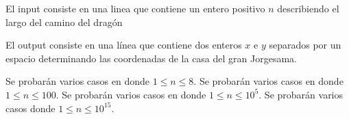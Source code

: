 \documentclass{oci}
\begin{document}
\begin{inputDescription}
El input consiste en una linea que contiene un entero positivo $n$ describiendo el largo del camino del drag\'on
\end{inputDescription}

\begin{outputDescription}
El output consiste en una l\'inea que contiene dos enteros $x$ e $y$ separados por un espacio determinando las coordenadas de la casa del gran Jorgesama.
\end{outputDescription}

\begin{scoreDescription}
 Se probar\'an varios casos en donde $1 \leq n \leq 8$.
 Se probar\'an varios casos en donde $1 \leq n \leq 100$.
 Se probar\'an varios casos en donde $1 \leq n \leq 10^5$.
 Se probar\'an varios casos donde $1 \leq n \leq 10^{15}$. 
\end{scoreDescription}

\begin{sampleDescription}
\end{sampleDescription}
\end{document}

